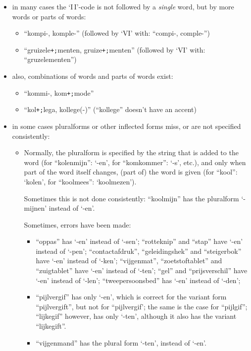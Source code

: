 \begin{itemize}
  \item in many cases the `I\,I'-code is not followed by a {\em single} word, 
        but by more words or parts of words:
     \begin{itemize}
        \item ``kompi-, komple-''  (followed by `VI' with: ``compi-, comple-'')
        \item ``gruizele{\tt +;}menten, gruize{\tt +;}menten'' (followed by `VI' with: 
              ``gruzelementen'')
     \end{itemize}
  \item also, combinations of words and parts of words exist:
     \begin{itemize}
        \item  ``kommi-, kom{\tt +;}mode''
        \item  ``kol{\tt +;}lega, kollege(-)'' (``kollege'' doesn't have an
                accent)
     \end{itemize}
  \item in some cases pluralforms or other inflected forms miss, or are not 
        specified consistently:
     \begin{itemize}
        \item Normally, the pluralform is specified by the string that is added
              to the word (for ``kolenmijn'': \mbox{`-en'}, for ``komkommer'': 
              \mbox{`-s'}, etc.),
              and only when part of the word itself changes, (part of) the word
              is given (for ``kool'': `kolen', for ``koolmees'': `koolmezen').
              
              Sometimes this is not done consistently: ``koolmijn'' has the 
              pluralform \mbox{`-mijnen'} instead of \mbox{`-en'}. 

              Sometimes, errors have been made:
        \begin{itemize}
            \item
              ``oppas'' has \mbox{`-en'} instead of \mbox{`-sen'};
              ``rotteknip'' and ``stap'' have \mbox{`-en'} instead of \mbox{`-pen'};
              ``contactafdruk'', ``geleidingshek'' and ``steigerbok'' have
                 \mbox{`-en'} instead of \mbox{`-ken'}; 
              ``vijgenmat'', ``zoetstoftablet'' and ``zuigtablet'' have 
                 \mbox{`-en'} instead of \mbox{`-ten'};
              ``gel'' and ``prijsverschil'' have \mbox{`-en'} instead of 
                 \mbox{`-len'};
              ``tweepersoonsbed'' has \mbox{`-en'} instead of \mbox{`-den'};
            \item
              ``pijlvergif'' has only \mbox{`-en'}, which is correct for the
              variant form ``pijlvergift'', but not for ``pijlvergif'; the same 
              is the case for ``pijlgif''; ``lijkegif'' however, has only 
              \mbox{`-ten'}, although it also has the variant ``lijkegift''.
            \item
              ``vijgenmand'' has the plural form \mbox{`-ten'}, instead of 
              \mbox{`-en'}.
        \end{itemize}


\end{itemize}
\end{itemize}
